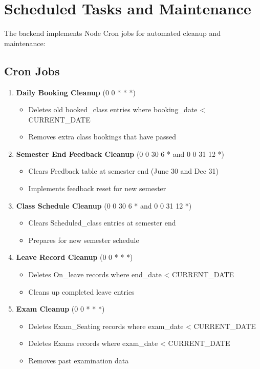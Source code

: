 \documentclass[12pt]{article}
\begin{document}
\newpage

\section{Scheduled Tasks and Maintenance}

The backend implements Node Cron jobs for automated cleanup and maintenance:

\subsection{Cron Jobs}

\begin{enumerate}
    \item \textbf{Daily Booking Cleanup} (0 0 * * *)
        \begin{itemize}
            \item Deletes old booked\_class entries where booking\_date < CURRENT\_DATE
            \item Removes extra class bookings that have passed
        \end{itemize}
    
    \item \textbf{Semester End Feedback Cleanup} (0 0 30 6 * and 0 0 31 12 *)
        \begin{itemize}
            \item Clears Feedback table at semester end (June 30 and Dec 31)
            \item Implements feedback reset for new semester
        \end{itemize}
    
    \item \textbf{Class Schedule Cleanup} (0 0 30 6 * and 0 0 31 12 *)
        \begin{itemize}
            \item Clears Scheduled\_class entries at semester end
            \item Prepares for new semester schedule
        \end{itemize}
    
    \item \textbf{Leave Record Cleanup} (0 0 * * *)
        \begin{itemize}
            \item Deletes On\_leave records where end\_date < CURRENT\_DATE
            \item Cleans up completed leave entries
        \end{itemize}
    
    \item \textbf{Exam Cleanup} (0 0 * * *)
        \begin{itemize}
            \item Deletes Exam\_Seating records where exam\_date < CURRENT\_DATE
            \item Deletes Exams records where exam\_date < CURRENT\_DATE
            \item Removes past examination data
        \end{itemize}
\end{enumerate}
\end{document}
